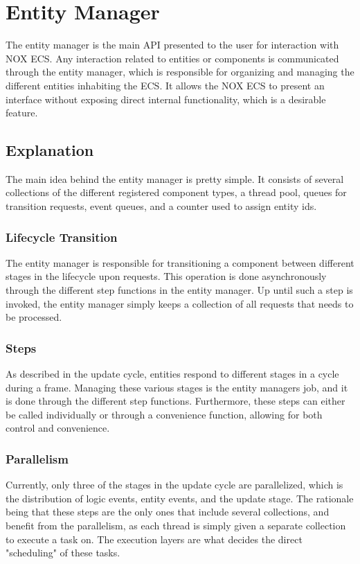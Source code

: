 \section{Entity Manager}
\label{subsec:detailed_entity_manager}
The entity manager is the main API presented to the user for interaction with NOX ECS.
Any interaction related to entities or components is communicated through the entity manager, which is responsible for organizing and managing the different entities inhabiting the ECS.
It allows the NOX ECS to present an interface without exposing direct internal functionality, which is a desirable feature.

\subsection{Explanation}
The main idea behind the entity manager is pretty simple.
It consists of several collections of the different registered component types,
a thread pool, queues for transition requests, event queues, and a counter
used to assign entity ids.

\subsubsection{Lifecycle Transition}
The entity manager is responsible for transitioning a component between different stages in the lifecycle upon requests.
This operation is done asynchronously through the different step functions in the entity manager.
Up until such a step is invoked, the entity manager simply keeps a collection of all requests that needs to be processed.

\subsubsection{Steps}
As described in the update cycle, entities respond to different stages in a cycle during a frame. Managing these various stages is the entity managers job, and it is done through the different step functions.
Furthermore, these steps can either be called individually or through a convenience function, allowing for both control and convenience.

\subsubsection{Parallelism}
Currently, only three of the stages in the update cycle are parallelized, which is
the distribution of logic events, entity events, and the update stage.
The rationale being that these steps are the only ones that include several collections, and benefit from the parallelism, as each thread is simply given a separate collection to execute a task on.
The execution layers are what decides the direct "scheduling" of these tasks.

